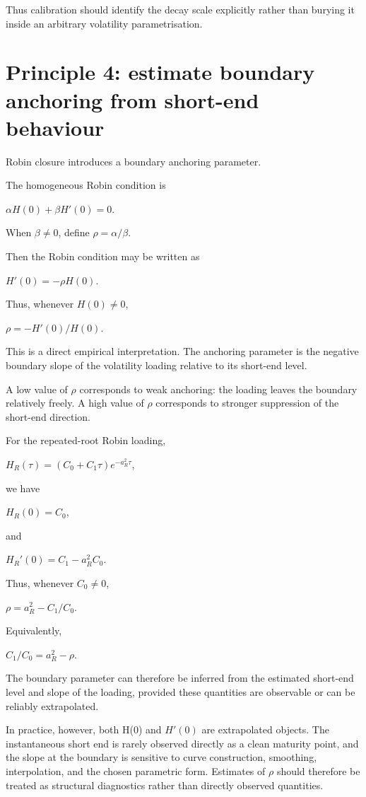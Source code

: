 \documentclass[11pt,oneside]{book}
\begin{document}
Thus calibration should identify the decay scale explicitly rather than
burying it inside an arbitrary volatility parametrisation.

\section{Principle 4: estimate boundary anchoring from short-end
behaviour}\label{principle-4-estimate-boundary-anchoring-from-short-end-behaviour}

Robin closure introduces a boundary anchoring parameter.

The homogeneous Robin condition is

$\alpha H(0)+\beta H'(0)=0$.

When $\beta\neq0$, define $\rho=\alpha/\beta$.

Then the Robin condition may be written as

$H'(0)=-\rho H(0)$.

Thus, whenever $H(0)\neq0$,

$\rho=-H'(0)/H(0)$.

This is a direct empirical interpretation. The anchoring parameter is
the negative boundary slope of the volatility loading relative to its
short-end level.

A low value of $\rho$ corresponds to weak anchoring: the loading leaves the
boundary relatively freely. A high value of $\rho$ corresponds to stronger
suppression of the short-end direction.

For the repeated-root Robin loading,

$H_R(\tau)=(C_0+C_1\tau)e^{-a_R^2\tau}$,

we have

$H_R(0)=C_0$,

and

$H_R'(0)=C_1-a_R^2C_0$.

Thus, whenever $C_0\neq0$,

$\rho=a_R^2-C_1/C_0$.

Equivalently,

$C_1/C_0=a_R^2-\rho$.

The boundary parameter can therefore be inferred from the estimated
short-end level and slope of the loading, provided these quantities are
observable or can be reliably extrapolated.

In practice, however, both H(0) and $H'(0)$ are extrapolated objects. The
instantaneous short end is rarely observed directly as a clean maturity
point, and the slope at the boundary is sensitive to curve construction,
smoothing, interpolation, and the chosen parametric form. Estimates of $\rho$
should therefore be treated as structural diagnostics rather than
directly observed quantities.
\end{document}
